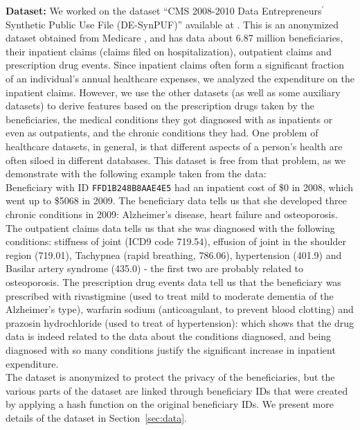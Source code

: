 {\bf Dataset: } We worked on the dataset ``CMS 2008-2010 Data Entrepreneurs$^\prime$ Synthetic Public Use File (DE-SynPUF)'' available at \cite{desynpuf}. This is an anonymized dataset obtained from Medicare \cite{medicare}, and has data about 6.87 million beneficiaries, their inpatient claims (claims filed on hospitalization), outpatient claims and prescription drug events. Since inpatient claims often form a significant fraction of an individual's annual healthcare expenses, we analyzed the expenditure on the inpatient claims. However, we use the other datasets (as well as some auxiliary datasets) to derive features based on the prescription drugs taken by the beneficiaries, the medical conditions they got diagnosed with as inpatients or even as outpatients, and the chronic conditions they had. One problem of healthcare datasets, in general, is that different aspects of a person's health are often siloed in different databases. This dataset is free from that problem, as we demonstrate with the following example taken from the data:\\
 
Beneficiary with ID \texttt{FFD1B248B8AAE4E5} had an inpatient cost of \$0 in 2008, which went up to \$5068 in 2009. The beneficiary data tells us that she developed three chronic conditions in 2009: Alzheimer's disease, heart failure and osteoporosis. The outpatient claims data tells us that she was diagnosed with the following conditions: stiffness of joint (ICD9 code 719.54), effusion of joint in the shoulder region (719.01), Tachypnea (rapid breathing, 786.06), hypertension (401.9) and Basilar artery syndrome (435.0) - the first two are probably related to osteoporosis. The prescription drug events data tell us that the beneficiary was prescribed with rivastigmine (used to treat mild to moderate dementia of the Alzheimer's type), warfarin sodium (anticoagulant, to prevent blood clotting) and prazosin hydrochloride (used to treat of hypertension): which shows that the drug data is indeed related to the data about the conditions diagnosed, and being diagnosed with so many conditions justify the significant increase in inpatient expenditure.\\

The dataset is anonymized to protect the privacy of the beneficiaries, but the various parts of the dataset are linked through beneficiary IDs that were created by applying a hash function on the original beneficiary IDs. We present more details of the dataset in Section~\ref{sec:data}.\\

